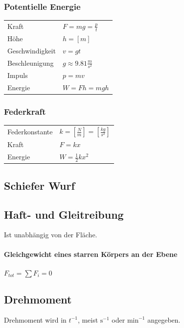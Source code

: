 \documentclass[a4paper]{scrartcl}
\begin{document}
\subsubsection{Potentielle Energie}

\begin{tabu} {l X}
	Kraft & $F = mg = \frac{p}{t}$ \\
	Höhe & $h = \left[ m \right]$ \\
	Geschwindigkeit & $v = gt$ \\
	Beschleunigung & $g \approx 9.81 \frac{m}{s^2}$ \\
	Impuls & $p = mv$ \\
	Energie & $W = Fh = mgh$
\end{tabu}

\subsubsection{Federkraft}

	
	\begin{tabu} {l X}
		Federkonstante & $k = \left[ \frac{N}{m} \right] = \left[ \frac{kg}{s^2} \right]$ \\
		Kraft & $F = kx$ \\ %
		Energie & $	W = \frac{1}{2} k x^2$
	\end{tabu}
	

\subsection{Schiefer Wurf}

\subsection{Haft- und Gleitreibung}
	Ist unabhängig von der Fläche.
	
	
	
	\paragraph{Gleichgewicht eines starren Körpers an der Ebene}
	$F_{tot} = \sum{F_i} = 0$


\subsection{Drehmoment}
	Drehmoment wird in $t^{-1}$, meist $\text{s}^{-1}$ oder $\text{min}^{-1}$ angegeben.
	
\end{document}

